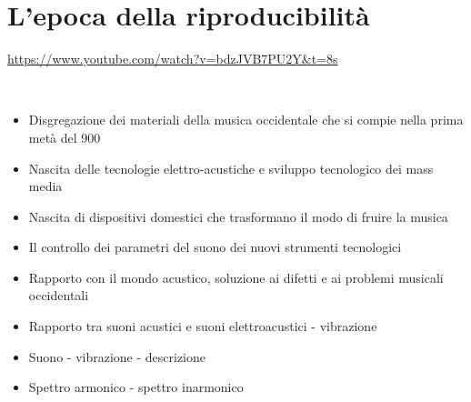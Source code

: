
\section{L'epoca della riproducibilità}

\url{https://www.youtube.com/watch?v=bdzJVB7PU2Y&t=8s}

~\vfill

\begin{itemize}
\item Disgregazione dei materiali della musica occidentale che si compie nella prima metà del 900
\item Nascita delle tecnologie elettro-acustiche e sviluppo tecnologico dei mass media
\item Nascita di dispositivi domestici che  trasformano il modo di fruire la musica
\item Il controllo dei parametri del suono dei nuovi strumenti tecnologici
\item Rapporto con il mondo acustico, soluzione ai difetti e ai problemi musicali occidentali
\item Rapporto tra suoni acustici e suoni elettroacustici - vibrazione
\item Suono - vibrazione - descrizione
\item Spettro armonico - spettro inarmonico
\end{itemize}

\clearpage













